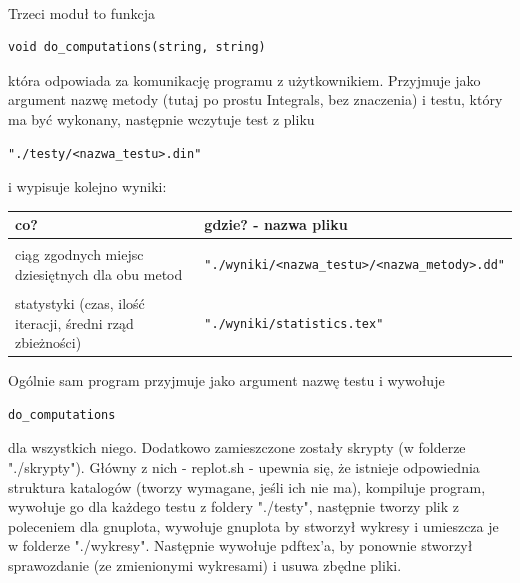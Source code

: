 \documentclass[11pt,wide]{mwart}
\begin{document}
\\Trzeci moduł to funkcja 
\begin{verbatim}
void do_computations(string, string)
\end{verbatim} 
która odpowiada za komunikację programu z użytkownikiem.
Przyjmuje jako argument nazwę metody (tutaj po prostu Integrals, bez znaczenia) i testu, który ma być wykonany, następnie wczytuje test z pliku \begin{verbatim}"./testy/<nazwa_testu>.din"\end{verbatim} i wypisuje kolejno wyniki:\\
\begin{tabular}{l l}
   \hline
  co?                                                       & gdzie? - nazwa pliku\\
  \hline
  ciąg zgodnych miejsc dziesiętnych dla obu metod           & 
    \begin{minipage}{3in} \begin{verbatim}"./wyniki/<nazwa_testu>/<nazwa_metody>.dd"\end{verbatim} 
      \end{minipage}\\
  statystyki (czas, ilość iteracji, średni rząd zbieżności) & 
    \begin{minipage}{3in} \begin{verbatim}"./wyniki/statistics.tex"\end{verbatim} 
      \end{minipage}\\
\end{tabular}
\indent Ogólnie sam program przyjmuje jako argument nazwę testu i wywołuje 
\begin{verbatim}do_computations\end{verbatim} dla wszystkich niego.
Dodatkowo zamieszczone zostały skrypty (w folderze "./skrypty"). Główny z nich - replot.sh - upewnia się, że istnieje odpowiednia struktura katalogów (tworzy wymagane, jeśli ich nie ma), kompiluje program, wywołuje go dla każdego testu z foldery "./testy", następnie tworzy plik z poleceniem dla gnuplota, wywołuje gnuplota by stworzył wykresy i umieszcza je w folderze "./wykresy". Następnie wywołuje pdftex'a, by ponownie stworzył sprawozdanie (ze zmienionymi wykresami) i usuwa zbędne pliki.
\end{document}
